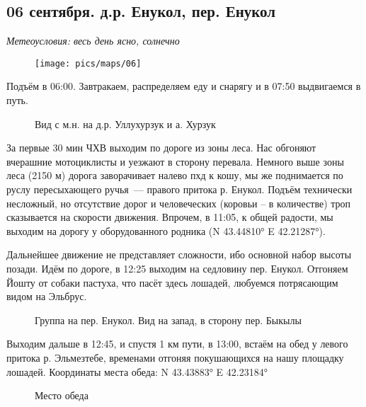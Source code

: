 \subsection{06 сентября. д.р. Енукол, пер. Енукол}
\textit{Метеоусловия: весь день ясно, солнечно}

\begin{figure}[h!]
	\centering
	\texttt{[image: pics/maps/06]}
	\label{fig:06}
\end{figure}

Подъём в 06:00. Завтракаем, распределяем еду и снарягу и в 07:50 выдвигаемся в путь.

\begin{figure}[h!]
	\centering
	\caption{Вид с м.н. на д.р. Уллухурзук и а. Хурзук}
	\label{fig:camp05}
\end{figure}

За первые 30 мин ЧХВ выходим по дороге из зоны леса. Нас обгоняют вчерашние мотоциклисты и уезжают в сторону перевала. Немного выше зоны леса (2150 м) дорога заворачивает налево пхд к кошу, мы же поднимается по руслу пересыхающего ручья~--- правого притока р. Енукол. Подъём технически несложный, но отсутствие дорог и человеческих (коровьи -- в количестве) троп сказывается на скорости движения. Впрочем, в 11:05, к общей радости, мы выходим на дорогу у оборудованного родника (N 43.44810° E 42.21287°).

Дальнейшее движение не представляет сложности, ибо основной набор высоты позади. Идём по дороге, в 12:25 выходим на седловину пер. Енукол. Отгоняем Йошту от собаки пастуха, что пасёт здесь лошадей, любуемся потрясающим видом на Эльбрус.

\begin{figure}[h!]
	\centering
	\caption{Группа на пер. Енукол. Вид на запад, в сторону пер. Быкылы}
	\label{fig:enukol}
\end{figure}

Выходим дальше в 12:45, и спустя 1 км пути, в 13:00, встаём на обед у левого притока р. Эльмезтебе, временами отгоняя покушающихся на нашу площадку лошадей. Координаты места обеда: N 43.43883° E 42.23184°

\begin{figure}[h!]
	\centering
	\caption{Место обеда}
	\label{fig:06_dinner}
\end{figure}

